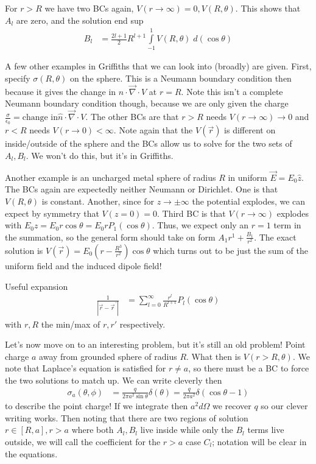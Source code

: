 \documentclass[10pt]{report}
\newcommand{\pvec}[1]{\vec{#1}^{\,\prime}}
\renewcommand{\div}[0]{\vec{\nabla}\cdot}
\newcommand{\abs}[1]{\left|#1\right|}
\begin{document}
For $r > R$ we have two BCs again, $V(r \to \infty) = 0, V(R, \theta)$. This shows that $A_l$ are zero, and the solution end sup
\begin{align}
    B_l &= \frac{2l+1}{2}R^{l+1}\displaystyle\int\limits_{-1}^{1}V(R,\theta)\;d(\cos\theta)
\end{align}

A few other examples in Griffiths that we can look into (broadly) are given. First, specify $\sigma(R,\theta)$ on the sphere. This is a Neumann boundary condition then because it gives the change in $\hat{n} \cdot \div V$ at $r = R$. Note this isn't a complete Neumann boundary condition though, because we are only given the charge $\frac{\sigma}{\epsilon_0} = \text{change in} \hat{n}\cdot \div V$. The other BCs are that $r > R$ needs $V(r \to \infty)\to 0$ and $r < R$ needs $V(r \to 0) < \infty$. Note again that the $V(\vec{r})$ is different on inside/outside of the sphere and the BCs allow us to solve for the two sets of $A_l, B_l$. We won't do this, but it's in Griffiths.

Another example is an uncharged metal sphere of radius $R$ in uniform $\vec{E} = E_0\hat{z}$. The BCs again are expectedly neither Neumann or Dirichlet. One is that $V(R,\theta)$ is constant. Another, since for $z \to \pm \infty$ the potential explodes, we can expect by symmetry that $V(z=0) = 0$. Third BC is that $V(r \to \infty)$ explodes with $E_0z = E_0r\cos\theta = E_0rP_1(\cos\theta)$. Thus, we expect only an $r=1$ term in the summation, so the general form should take on form $A_1r^1 + \frac{B_1}{r^2}$. The exact solution is $V(\vec{r}) = E_0\left( r-\frac{R^3}{r^2} \right)\cos\theta$ which turns out to be just the sum of the uniform field and the induced dipole field! 

Useful expansion
\begin{align}
    \frac{1}{\abs{\vec{r} - \pvec{r}}} &= \sum_{l=0}^{\infty}\frac{r^l}{R^{l+1}}P_l(\cos\theta)\label{2.27.useful}
\end{align}
with $r,R$ the min/max of $r, r'$ respectively.

Let's now move on to an interesting problem, but it's still an old problem! Point charge $a$ away from grounded sphere of radius $R$. What then is $V(r > R, \theta)$. We note that Laplace's equation is satisfied for $r \neq a$, so there must be a BC to force the two solutions to match up. We can write cleverly then
\begin{align}
    \sigma_a(\theta,\phi) &= \frac{q}{2\pi a^2\sin\theta}\delta(\theta) = \frac{q}{2\pi a^2}\delta(\cos\theta - 1)
\end{align}
to describe the point charge! If we integrate then $a^2d\Omega$ we recover $q$ so our clever writing works. Then noting that there are two regions of solution $r \in [R, a], r > a$ where both $A_l, B_l$ live inside while only the $B_l$ terms live outside, we will call the coefficient for the $r > a$ case $C_l$; notation will be clear in the equations.
\end{document}
